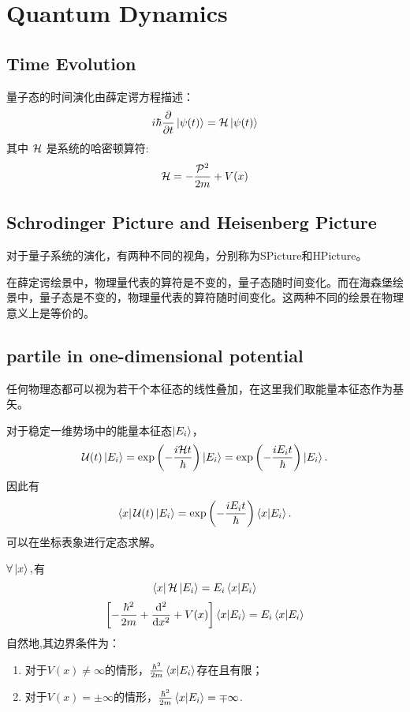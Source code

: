 \chapter{Quantum Dynamics}
\section{Time Evolution}
量子态的时间演化由薛定谔方程描述：
\begin{equation}
    i\hbar \frac{\partial}{\partial t} \left|\psi(t)\right> = \mathcal{H} \left|\psi(t)\right>
\end{equation}
其中 $\mathcal{H}$ 是系统的哈密顿算符:
\begin{equation}
    \mathcal{H}=-\frac{\mathcal{P}^2}{2m}+V(x)
\end{equation}

\section{Schrodinger Picture and Heisenberg Picture}
对于量子系统的演化，有两种不同的视角，分别称为\gls{SPicture}和\gls{HPicture}。

在薛定谔绘景中，物理量代表的算符是不变的，量子态随时间变化。而在海森堡绘景中，量子态是不变的，物理量代表的算符随时间变化。这两种不同的绘景在物理意义上是等价的。
\section{partile in one-dimensional potential}
任何物理态都可以视为若干个本征态的线性叠加，在这里我们取能量本征态作为基矢。

对于稳定一维势场中的能量本征态$\left|E_i\right>$，
\begin{equation}
    \mathcal{U}(t)\left|E_i\right>=\exp\left(-\frac{i\mathcal{H}t}{\hbar}\right)\left|E_i\right>=\exp\left(-\frac{iE_it}{\hbar}\right)\left|E_i\right>.
\end{equation}
因此有
\begin{equation}
    \left<x\right|\mathcal{U}(t)\left|E_i\right>=\exp\left(-\frac{iE_it}{\hbar}\right)\left<x\middle|E_i\right>.
\end{equation}
可以在坐标表象进行定态求解。

$\forall \left|x\right>, $有
\begin{equation}
    \left<x\right|\mathcal{H}\left|E_i\right>=E_i\left<x\middle|E_i\right>
\end{equation}
\begin{equation}
    \left[-\frac{\hbar^2}{2m}+\frac{\mathrm{d}^2 }{\mathrm{d} x^2}+V(x)\right]\left<x\middle|E_i\right>=E_i\left<x\middle|E_i\right>
\end{equation}
自然地,其边界条件为：
\begin{enumerate}
    \item 对于$V(x)\neq \infty$的情形，$\frac{\hbar^2}{2m}\left<x\middle|E_i\right>$存在且有限；
    \item 对于$V(x)=\pm\infty$的情形，$\frac{\hbar^2}{2m}\left<x\middle|E_i\right>=\mp\infty$.
\end{enumerate}
